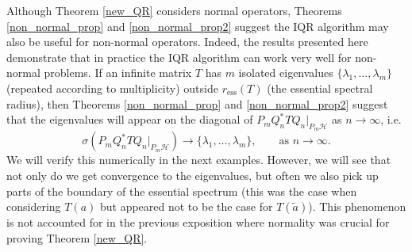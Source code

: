 \documentclass[a4paper,10pt]{article}
\begin{document}
Although Theorem \ref{new_QR} considers normal operators, Theorems \ref{non_normal_prop} and \ref{non_normal_prop2} suggest the IQR algorithm may also be useful for non-normal operators. Indeed, the results presented here demonstrate that in practice the IQR algorithm can work very well for non-normal problems. If an infinite matrix $T$ has $m$ isolated eigenvalues $\{\lambda_1, \hdots, \lambda_m\}$ (repeated according to multiplicity) outside $r_{\mathrm{ess}}(T)$ (the essential spectral radius), then Theorems \ref{non_normal_prop} and \ref{non_normal_prop2} suggest that the eigenvalues will appear
on the diagonal of 
$
P_mQ_n^*TQ_n|_{P_m\mathcal{H}}
$
as $n \rightarrow \infty$, i.e. 
$$
\sigma(P_mQ_n^*TQ_n|_{P_m\mathcal{H}}) \longrightarrow \{\lambda_1, \hdots, \lambda_m\},
 \qquad \text{as }n\rightarrow \infty.
$$
We will verify this numerically in the next examples. However, we will see that not only do we get convergence to the eigenvalues, but often we also pick up parts of the boundary of the essential spectrum (this was the case when considering $T(a)$ but appeared not to be the case for $T(\tilde a)$). This phenomenon is not accounted for in the previous exposition where normality was crucial for proving Theorem \ref{new_QR}.
\end{document}
